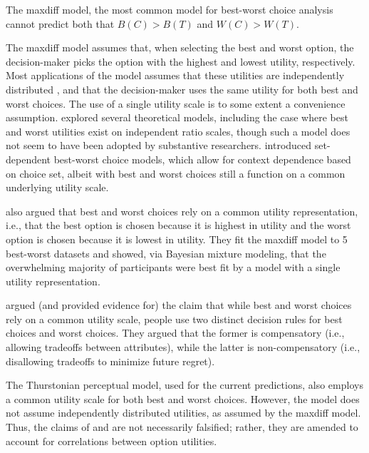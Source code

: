The maxdiff model, the most common model for best-worst choice analysis cannot predict both that $B(C)>B(T)$ and $W(C)>W(T)$.  

The maxdiff model assumes that, when selecting the best and worst option, the decision-maker picks the option with the highest and lowest utility, respectively. Most applications of the model assumes that these utilities are independently distributed \parencite{flynn2014best}, and that the decision-maker uses the same utility for both best and worst choices. The use of a single utility scale is to some extent a convenience assumption. \textcite{marleyProbabilisticModelsBest2005} explored several theoretical models, including the case where best and worst utilities exist on independent ratio scales, though such a model does not seem to have been adopted by substantive researchers. \textcite{marleyProbabilisticModelsSetdependent2008} introduced set-dependent best-worst choice models, which allow for context dependence based on choice set, albeit with best and worst choices still a function on a common underlying utility scale. 

\textcite{hawkins2019like} also argued that best and worst choices rely on a common utility representation, i.e., that the best option is chosen because it is highest in utility and the worst option is chosen because it is lowest in utility. They fit the maxdiff model to 5 best-worst datasets and showed, via Bayesian mixture modeling, that the overwhelming majority of participants were best fit by a model with a single utility representation. 

\textcite{gervzinivc2021estimating} argued (and provided evidence for) the claim that while best and worst choices rely on a common utility scale, people use two distinct decision rules for best choices and worst choices. They argued that the former is compensatory (i.e., allowing tradeoffs between attributes), while the latter is non-compensatory (i.e., disallowing tradeoffs to minimize future regret). 

The Thurstonian perceptual model, used for the current predictions, also employs a common utility scale for both best and worst choices. However, the model does not assume independently distributed utilities, as assumed by the maxdiff model. Thus, the claims of \textcite{hawkinsBestTimesWorst2014} and \textcite{hawkins2019like} are not necessarily falsified; rather, they are amended to account for correlations between option utilities. 

